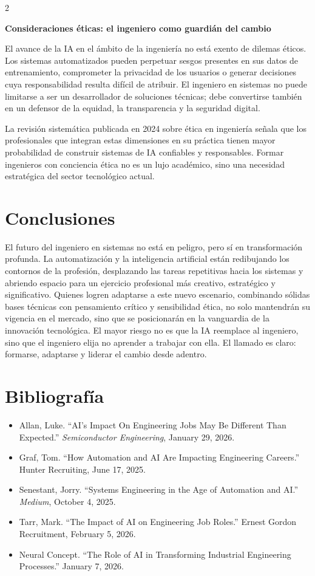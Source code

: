 \documentclass[10pt,spanish,Letterpaper,openany]{book}
\let\origtextbf\textbf
\renewcommand{\textbf}[1]{{\color{textlinetitle}\origtextbf{#1}}}
\begin{document}
\begin {multicols}{2}

\textbf{Consideraciones éticas: el ingeniero como guardián del cambio}

El avance de la IA en el ámbito de la ingeniería no está exento de dilemas éticos. Los sistemas automatizados pueden perpetuar sesgos presentes en sus datos de entrenamiento, comprometer la privacidad de los usuarios o generar decisiones cuya responsabilidad resulta difícil de atribuir. El ingeniero en sistemas no puede limitarse a ser un desarrollador de soluciones técnicas; debe convertirse también en un defensor de la equidad, la transparencia y la seguridad digital.

La revisión sistemática publicada en 2024 sobre ética en ingeniería señala que los profesionales que integran estas dimensiones en su práctica tienen mayor probabilidad de construir sistemas de IA confiables y responsables. Formar ingenieros con conciencia ética no es un lujo académico, sino una necesidad estratégica del sector tecnológico actual.

\section{Conclusiones}\label{conclusiones-6}

El futuro del ingeniero en sistemas no está en peligro, pero sí en transformación profunda. La automatización y la inteligencia artificial están redibujando los contornos de la profesión, desplazando las tareas repetitivas hacia los sistemas y abriendo espacio para un ejercicio profesional más creativo, estratégico y significativo. Quienes logren adaptarse a este nuevo escenario, combinando sólidas bases técnicas con pensamiento crítico y sensibilidad ética, no solo mantendrán su vigencia en el mercado, sino que se posicionarán en la vanguardia de la innovación tecnológica. El mayor riesgo no es que la IA reemplace al ingeniero, sino que el ingeniero elija no aprender a trabajar con ella. El llamado es claro: formarse, adaptarse y liderar el cambio desde adentro.

\section{Bibliografía}\label{bibliografuxeda-11}

\begin{itemize}
\item
  Allan, Luke. ``AI's Impact On Engineering Jobs May Be Different Than Expected.'' \emph{Semiconductor Engineering}, January 29, 2026.
\item
  Graf, Tom. ``How Automation and AI Are Impacting Engineering Careers.'' Hunter Recruiting, June 17, 2025.
\item
  Senestant, Jorry. ``Systems Engineering in the Age of Automation and AI.'' \emph{Medium}, October 4, 2025.
\item
  Tarr, Mark. ``The Impact of AI on Engineering Job Roles.'' Ernest Gordon Recruitment, February 5, 2026.
\item
  Neural Concept. ``The Role of AI in Transforming Industrial Engineering Processes.'' January 7, 2026.
\end{itemize}


\end{multicols}
\end{document}
